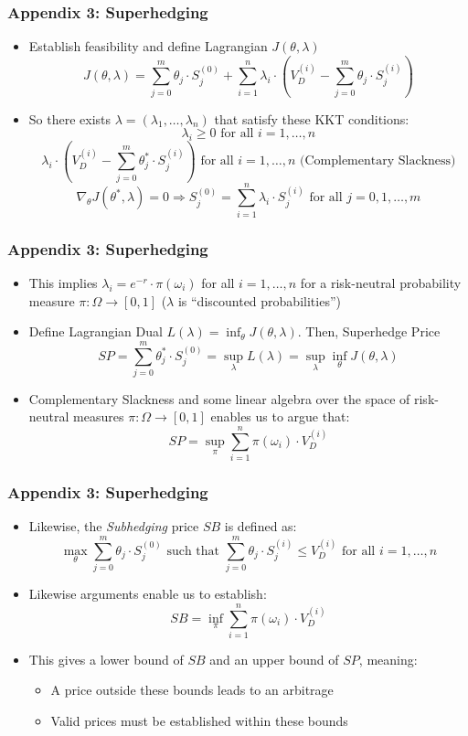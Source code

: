 \documentclass{beamer}
\begin{document}
\begin{frame}
\frametitle{Appendix 3: Superhedging}
\begin{itemize}
\item Establish feasibility and define Lagrangian $J(\theta, \lambda)$
$$J(\theta, \lambda) = \sum_{j=0}^m \theta_j \cdot S_j^{(0)} + \sum_{i=1}^n \lambda_i \cdot (V_D^{(i)} - \sum_{j=0}^m \theta_j \cdot S_j^{(i)})$$
\item So there exists $\lambda = (\lambda_1, \ldots, \lambda_n)$ that satisfy these KKT conditions:
$$\lambda_i \geq 0 \mbox{ for all } i = 1, \ldots, n$$
$$\lambda_i \cdot (V_D^{(i)} - \sum_{j=0}^m \theta_j^* \cdot S_j^{(i)}) \mbox{ for all } i = 1, \ldots, n \mbox{ (Complementary Slackness)}$$
$$\nabla_{\theta} J(\theta^*, \lambda) = 0 \Rightarrow S_j^{(0)} = \sum_{i=1}^n \lambda_i \cdot S_j^{(i)} \mbox{ for all } j = 0, 1, \ldots, m$$
\end{itemize}
\end{frame}

\begin{frame}
\frametitle{Appendix 3: Superhedging}
\begin{itemize}
\item This implies $\lambda_i = e^{-r} \cdot \pi(\omega_i)$ for all $i = 1, \ldots, n$ for a risk-neutral probability measure $\pi : \Omega \rightarrow [0,1]$ ($\lambda$ is ``discounted probabilities'')
\item Define Lagrangian Dual $L(\lambda) = \inf_{\theta} J(\theta, \lambda)$. Then, Superhedge Price
$$SP = \sum_{j=0}^m \theta_j^* \cdot S_j^{(0)} = \sup_{\lambda} L(\lambda) = \sup_{\lambda} \inf_{\theta} J(\theta, \lambda)$$
\item Complementary Slackness and some linear algebra over the space of risk-neutral measures $\pi : \Omega \rightarrow [0,1]$ enables us to argue that:
$$SP = \sup_{\pi} \sum_{i=1}^n \pi(\omega_i) \cdot V_D^{(i)}$$
\end{itemize}
\end{frame}

\begin{frame}
\frametitle{Appendix 3: Superhedging}
\begin{itemize}
\item Likewise, the {\em Subhedging} price $SB$ is defined as:
\begin{equation}
\max_{\theta} \sum_{j=0}^m \theta_j \cdot S_j^{(0)} \mbox{ such that } \sum_{j=0}^m \theta_j \cdot S_j^{(i)} \leq V_D^{(i)} \mbox{ for all } i = 1, \ldots, n
\end{equation}
\item Likewise arguments enable us to establish:
$$SB = \inf_{\pi} \sum_{i=1}^n \pi(\omega_i) \cdot V_D^{(i)}$$
\item This gives a lower bound of $SB$ and an upper bound of $SP$, meaning:
\begin{itemize}
\item A price outside these bounds leads to an arbitrage 
\item Valid prices must be established within these bounds
\end{itemize}
\end{itemize}
\end{frame}
\end{document}
